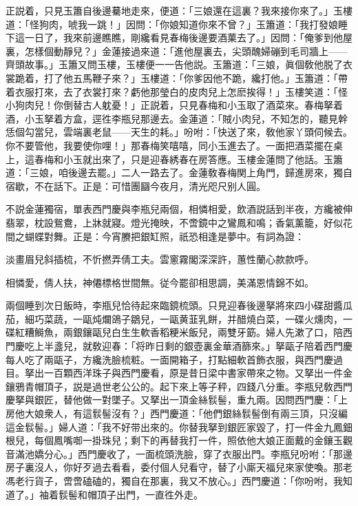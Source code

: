 正説着，只見玉簫自後邊驀地走來，便道：「三娘還在這裏？我來接你來了。」玉樓道：「怪狗肉，唬我一跳！」因問：「你娘知道你來不曾？」玉簫道：「我打發娘睡下這一日了，我來前邊瞧瞧，剛纔看見春梅後邊要酒菓去了。」因問：「俺爹到他屋裏，怎樣個動靜兒？」金蓮接過來道：「進他屋裏去，尖頭醜婦磞到毛司牆上——齊頭故事。」玉簫又問玉樓，玉樓便一一告他説。玉簫道：「三娘，眞個敎他脱了衣裳跪着，打了他五馬鞭子來？」玉樓道：「你爹因他不跪，纔打他。」玉簫道：「帶着衣服打來，去了衣裳打來？虧他那瑩白的皮肉兒上怎麽挨得！」玉樓笑道：「怪小狗肉兒！你倒替古人躭憂！」正説着，只見春梅和小玉取了酒菜來。春梅拏着酒，小玉拏着方盒，逕徃李瓶兒那邊去。金蓮道：「賊小肉兒，不知怎的，聽見幹恁個勾當兒，雲端裏老鼠——天生的耗。」吩咐：「快送了來，敎他家丫頭伺候去。你不要管他，我要使你哩！」那春梅笑嘻嘻，同小玉進去了。一面把酒菜擺在桌上，這春梅和小玉就出來了，只是迎春綉春在房答應。玉樓金蓮問了他話。玉簫道：「三娘，咱後邊去罷。」二人一路去了。金蓮敎春梅関上角門，歸進房來，獨自宿歇，不在話下。正是：可惜團圝今夜月，清光咫尺别人圓。

不説金蓮獨宿，單表西門慶與李瓶兒兩個，相憐相愛，飲酒説話到半夜，方纔被伸翡翠，枕設鴛鴦，上牀就寢。燈光掩映，不啻鏡中之鸞鳳和鳴；香氣薰籠，好似花間之蝴蝶對舞。正是：今宵賸把銀缸照，祇恐相逢是夢中。有詞為證：

\begin{myquote}
淡畫眉兒斜插梳，不忻撚弄倩工夫。雲窻霧閣深深許，蕙性蘭心款款呼。

相憐愛，倩人扶，神僊標格世間無。従今罷卻相思調，美滿恩情錦不如。
\end{myquote}

兩個睡到次日飯時，李瓶兒恰待起來臨鏡梳頭。只見迎春後邊拏將來四小碟甜醬瓜茄，細巧菜蔬，一甌炖爛鴿子鶵兒，一甌黄韮乳餅，并醋燒白菜，一碟火燻肉，一碟紅糟鰣魚，兩銀鑲甌兒白生生軟香稻粳米飯兒，兩雙牙筯。婦人先漱了口，陪西門慶吃上半盞兒，就敎迎春：「将昨日剩的銀壺裏金華酒篩來。」拏甌子陪着西門慶每人吃了兩甌子，方纔洗臉梳粧。一面開箱子，打點細軟首飾衣服，與西門慶過目。拏出一百顆西洋珠子與西門慶看，原是昔日梁中書家帶來之物。又拏出一件金鑲鴉青帽頂子，説是過世老公公的。起下來上等子秤，四錢八分重。李瓶兒敎西門慶拏與銀匠，替他做一對墜子。又拏出一頂金絲䯼髻，重九兩。因問西門慶：「上房他大娘衆人，有這䯼髻沒有？」西門慶道：「他們銀絲䯼髻倒有兩三頂，只沒編這金䯼髻。」婦人道：「我不好带出來的。你替我拏到銀匠家毀了，打一件金九鳳鈿根兒，每個鳳嘴啣一掛珠兒；剩下的再替我打一件，照依他大娘正面戴的金鑲玉觀音滿池嬌分心。」西門慶收了，一面梳頭洗臉，穿了衣服出門。李瓶兒吩咐：「那邊房子裏沒人，你好歹過去看看，委付個人兒看守，替了小廝天福兒來家使喚。那老馮老行貨子，啻啻磕磕的，獨自在那裏，我又不放心。」西門慶道：「你吩咐，我知道了。」袖着䯼髻和帽頂子出門，一直徃外走。

